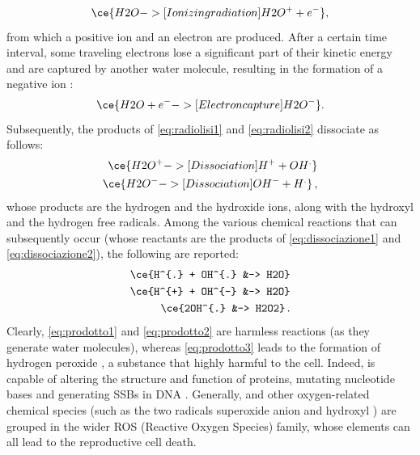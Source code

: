 \begin{equation}
	\ce{H2O ->[Ionizing radiation] H2O^{+} + e^-},
	\label{eq:radiolisi1}
\end{equation}
from which a positive ion  and an electron  are produced. After a certain time interval, some traveling electrons lose a significant part of their kinetic energy and are captured by another water molecule, resulting in the formation of a negative ion :
\begin{equation}
	\ce{H2O + e^{-} ->[Electron capture] H2O^{-}}.
	\label{eq:radiolisi2}
\end{equation}
Subsequently, the products of \autoref{eq:radiolisi1} and \autoref{eq:radiolisi2} dissociate as follows:
\begin{subequations}
	\begin{align}
		\label{eq:dissociazione1}
		\ce{H2O^{+} ->[Dissociation] H^{+} + OH^{.}}\\
		\label{eq:dissociazione2}
		\ce{H2O^{-} ->[Dissociation] OH^{-} + H^{.}}\,,
	\end{align}
\end{subequations}
whose products are the hydrogen  and the hydroxide  ions, along with the hydroxyl  and the hydrogen  free radicals. Among the various chemical reactions that can subsequently occur (whose reactants are the products of \autoref{eq:dissociazione1} and \autoref{eq:dissociazione2}), the following are reported:
\begin{subequations}
	\begin{align}
		\label{eq:prodotto1}
		\ce{H^{.} + OH^{.} &-> H2O}\\
		\label{eq:prodotto2}
		\ce{H^{+} + OH^{-} &-> H2O}\\
		\label{eq:prodotto3}
		\ce{2OH^{.} &-> H2O2}\,.
	\end{align}
\end{subequations}
Clearly, \autoref{eq:prodotto1} and \autoref{eq:prodotto2} are harmless reactions (as they generate water molecules), whereas \autoref{eq:prodotto3} leads to the formation of hydrogen peroxide , a substance that highly harmful to the cell. Indeed,  is capable of altering the structure and function of proteins, mutating nucleotide bases and generating SSBs in DNA \cite{ros}. Generally,  and other oxygen-related chemical species (such as the two radicals superoxide anion  and hydroxyl ) are grouped in the wider ROS (Reactive Oxygen Species) family, whose elements can all lead to the reproductive cell death.
